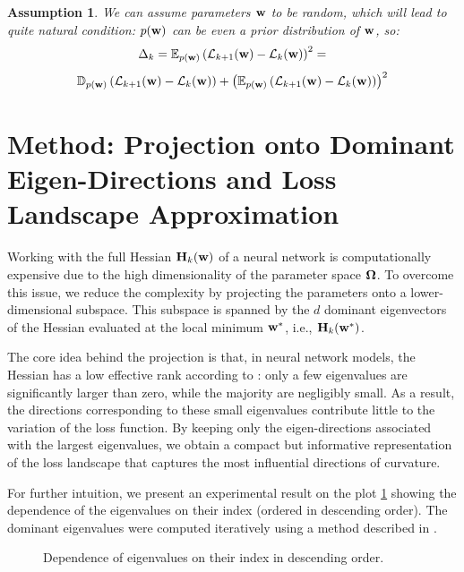 \documentclass{article}
\newtheorem{assumption}{Assumption}
\begin{document}
\begin{assumption}
  We can assume parameters $\mathbf{w}$ to be random, which will lead to quite natural condition: $p(\mathbf{w})$ can be even a prior
  distribution of $\mathbf{w}$, so:
  $$\Delta_{k} = \mathbb{E}_{p(\mathbf{w})} \left( \mathcal{L}_{k+1}(\mathbf{w}) - \mathcal{L}_{k}(\mathbf{w}) \right)^2 = $$
  $$\mathbb{D}_{p(\mathbf{w})} \left( \mathcal{L}_{k+1}(\mathbf{w}) - \mathcal{L}_{k}(\mathbf{w}) \right) + \left( \mathbb{E}_{p(\mathbf{w})} \left(
      \mathcal{L}_{k+1}(\mathbf{w}) - \mathcal{L}_{k}(\mathbf{w}) \right) \right)^2$$
\end{assumption}

\section{Method: Projection onto Dominant Eigen-Directions and Loss Landscape Approximation}

Working with the full Hessian $\mathbf{H}_k(\mathbf{w})$ of a neural network is computationally expensive due to the high dimensionality
of the parameter space $\boldsymbol{\Omega}$. To overcome this issue, we reduce the complexity by projecting the parameters onto a lower-dimensional
subspace. This subspace is spanned by the $d$ dominant eigenvectors of the Hessian evaluated at the local minimum $\mathbf{w}^*$, i.e.,
$\mathbf{H}_k(\mathbf{w}^*)$.

The core idea behind the projection is that, in neural network models, the Hessian has a low effective rank according to
\cite{sagun2018empirical}: only a few eigenvalues are significantly larger than zero, while the majority are negligibly small.
As a result, the directions corresponding to these small eigenvalues contribute little to the variation of the loss
function. By keeping only the eigen-directions associated with the largest eigenvalues, we obtain a compact but informative
representation of the loss landscape that captures the most influential directions of curvature.

For further intuition, we present an experimental result on the plot \ref{fig:evgen} showing the dependence of the eigenvalues
on their index (ordered in descending order). The dominant eigenvalues were computed iteratively using a method described in
\cite{hessian-eigenthings}.

\begin{figure}[!htbp]
  \centering
  \caption{Dependence of eigenvalues on their index in descending order.}
  \label{fig:evgen}
\end{figure}
\end{document}
